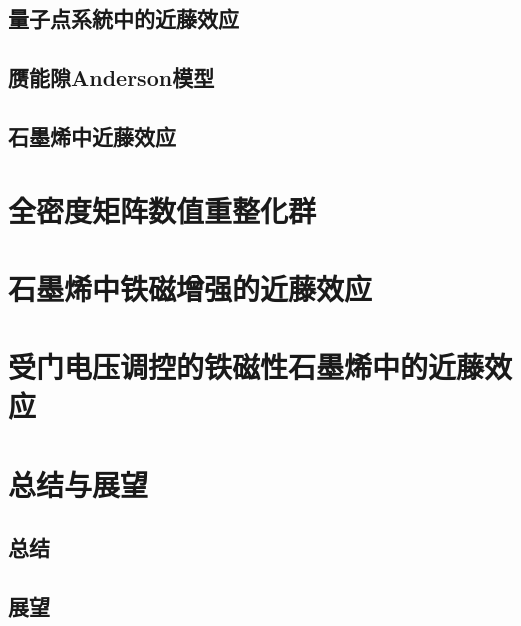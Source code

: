 \documentclass[twoside]{LZUthesis}
\begin{document}
\section{量子点系統中的近藤效应}
\section{赝能隙Anderson模型}
\section{石墨烯中近藤效应}

\chapter{全密度矩阵数值重整化群}


\chapter{石墨烯中铁磁增强的近藤效应}


\chapter{受门电压调控的铁磁性石墨烯中的近藤效应}


\chapter{总结与展望}

\section{总结}
\section{展望}




%
%
\iffalse
\renewcommand{\baselinestretch}{1}\zihao{5}\begingroup\raggedright\begin{thebibliography}{100} \makeatletter
	\bibitem{Jandl1996_7318}
	S.~Jandl, M.~Poirier, M.~Castonguay, P.~Fronzes, J.~L. Musfeldt,
	A.~Revcolevschi, and G.~Dhalenne.
	{\it Phonons in pure and doped ${\mathrm{CuGeO}}_{3}$ spin-peierls crystals: Raman and ultrasonic studies}.
	\href{https://link.aps.org/doi/10.1103/PhysRevB.54.7318} {Phys.	Rev. B \textbf{54}, 7318 (1996)}.

\end{thebibliography}
\fi
\end{document}
